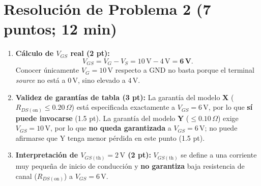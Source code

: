 \documentclass[11pt, a4paper]{article}
\begin{document}
\section*{Resolución de Problema 2 (7 puntos; 12 min)}

\begin{minipage}[t]{0.62\linewidth}
\begin{enumerate}[label=\arabic*., noitemsep, topsep=2pt]
    \item \textbf{Cálculo de $V_{GS}$ real (2 pt):}
    \[
        V_{GS} = V_G - V_S = 10\,\text{V} - 4\,\text{V} = \mathbf{6\,\text{V}}.
    \]
    Conocer únicamente $V_G = 10\,\text{V}$ respecto a GND no basta porque el terminal \textit{source} no está a $0\,\text{V}$, sino elevado a $4\,\text{V}$.
    \item \textbf{Validez de garantías de tabla (3 pt):} La garantía del modelo \textbf{X} ($R_{DS(\text{on})} \le 0.20\,\Omega$) está especificada exactamente a $V_{GS} = 6\,\text{V}$, por lo que \textbf{sí puede invocarse} (1.5 pt). La garantía del modelo \textbf{Y} ($\le 0.10\,\Omega$) exige $V_{GS} = 10\,\text{V}$, por lo que \textbf{no queda garantizada} a $V_{GS} = 6\,\text{V}$; no puede afirmarse que Y tenga menor pérdida en este punto (1.5 pt).
    \item \textbf{Interpretación de $V_{GS(\text{th})} = 2\,\text{V}$ (2 pt):} $V_{GS(\text{th})}$ se define a una corriente muy pequeña de inicio de conducción y \textbf{no garantiza} baja resistencia de canal ($R_{DS(\text{on})}$) a $V_{GS} = 6\,\text{V}$.
\end{enumerate}
\end{minipage}\hfill
\begin{minipage}[t]{0.35\linewidth}
\vspace{0pt}
\begin{center}
\end{center}
\end{minipage}
\end{document}
